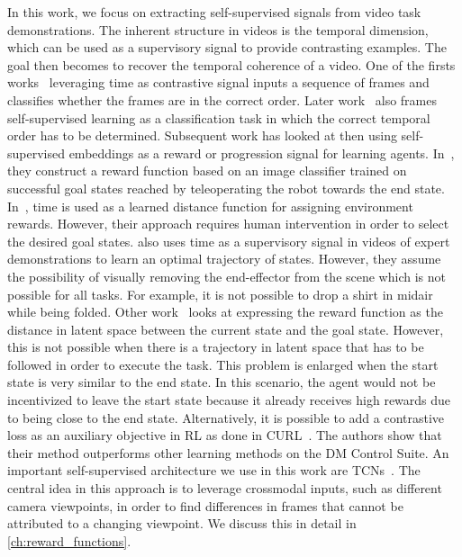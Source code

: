 \documentclass[\home/main.tex]{subfiles}
\begin{document}
In this work, we focus on extracting self-supervised signals from video task demonstrations. The inherent structure in videos is the temporal dimension, which can be used as a supervisory signal to provide contrasting examples. The goal then becomes to recover the temporal coherence of a video. One of the firsts works~\cite{Misra2016} leveraging time as contrastive signal inputs a sequence of frames and classifies whether the frames are in the correct order. Later work~\cite{Lee2017,Fernando2017} also frames self-supervised learning as a classification task in which the correct temporal order has to be determined. Subsequent work has looked at then using self-supervised embeddings as a reward or progression signal for learning agents.
In~\cite{Singh2019}, they construct a reward function based on an image classifier trained on successful goal states reached by teleoperating the robot towards the end state. In~\cite{Hartikainen2019}, time is used as a learned distance function for assigning environment rewards. However, their approach requires human intervention in order to select the desired goal states. \cite{Nair2018time} also uses time as a supervisory signal in videos of expert demonstrations to learn an optimal trajectory of states. However, they assume the possibility of visually removing the end-effector from the scene which is not possible for all tasks. For example, it is not possible to drop a shirt in midair while being folded. Other work~\cite{Nair2018visual} looks at expressing the reward function as the distance in latent space between the current state and the goal state. However, this is not possible when there is a trajectory in latent space that has to be followed in order to execute the task. This problem is enlarged when the start state is very similar to the end state. In this scenario, the agent would not be incentivized to leave the start state because it already receives high rewards due to being close to the end state. %
Alternatively, it is possible to add a contrastive loss as an auxiliary objective in RL as done in CURL~\cite{Srinivas2020CURL}. The authors show that their method outperforms other learning methods on the DM Control Suite.
An important self-supervised architecture we use in this work are \glspl{TCN}~\autocite{Sermanet2017TCN}. The central idea in this approach is to leverage crossmodal inputs, such as different camera viewpoints, in order to find differences in frames that cannot be attributed to a changing viewpoint. We discuss this in detail in \cref{ch:reward_functions}.
\end{document}

